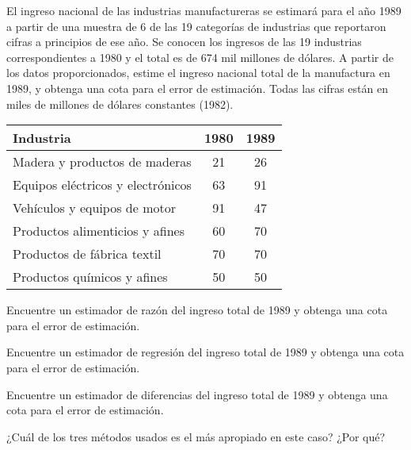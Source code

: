 \addpoints
\question El ingreso nacional de las industrias manufactureras se estimará para el año 1989 a partir de una muestra de 6 de las 19 categorías de industrias que reportaron cifras a principios de ese año. Se conocen los ingresos de las 19 industrias correspondientes a 1980 y el total es de 674 mil millones de dólares. A partir de los datos proporcionados, estime el ingreso nacional total de la manufactura en 1989, y obtenga una cota para el error de estimación. Todas las cifras están en miles de millones de dólares constantes (1982).

\begin{center}
\begin{tabular}{lcc}
\hline Industria & 1980 & 1989 \\
\hline Madera y productos de maderas & 21 & 26 \\
Equipos eléctricos y electrónicos & 63 & 91 \\
Vehículos y equipos de motor & 91 & 47 \\
Productos alimenticios y afines & 60 & 70 \\
Productos de fábrica textil & 70 & 70 \\
Productos químicos y afines & 50 & 50 \\
\hline
\end{tabular}
\end{center}
\noaddpoints
\begin{parts}
\item Encuentre un estimador de razón del ingreso total de 1989 y obtenga una cota para el error de estimación.
\item Encuentre un estimador de regresión del ingreso total de 1989 y obtenga una cota para el error de estimación.
\item Encuentre un estimador de diferencias del ingreso total de 1989 y obtenga una cota para el error de estimación.
\item ¿Cuál de los tres métodos usados es el más apropiado en este caso? ¿Por qué?
\end{parts}